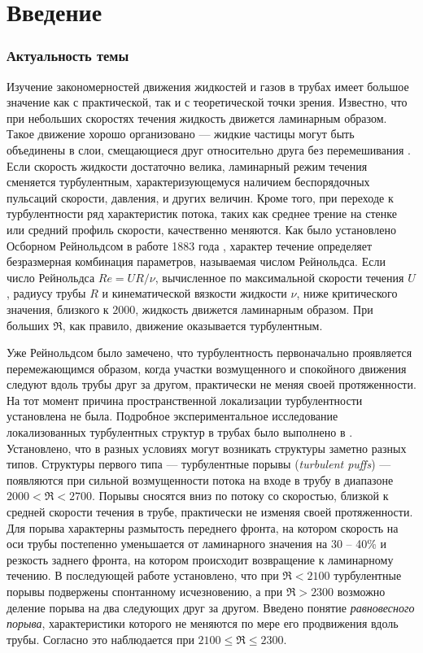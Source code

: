 \chapter{Введение}

\subsection{Актуальность темы} 

Изучение закономерностей движения жидкостей и газов в трубах имеет большое значение как с практической, так и с теоретической точки зрения. Известно, что при небольших скоростях течения жидкость движется ламинарным образом. Такое движение хорошо организовано --- жидкие частицы могут быть объединены в слои, смещающиеся друг относительно друга без перемешивания \cite{Hof2010}. Если скорость жидкости достаточно велика, ламинарный режим течения сменяется турбулентным, характеризующемуся наличием беспорядочных пульсаций скорости, давления, и других величин. Кроме того, при переходе к турбулентности ряд характеристик потока, таких как среднее трение на стенке или средний профиль скорости, качественно меняются. Как было установлено Осборном Рейнольдсом в работе 1883 года \cite{Reynolds1883}, характер течение определяет безразмерная комбинация параметров, называемая числом Рейнольдса. Если число Рейнольдса $Re=UR/\nu$, вычисленное по максимальной скорости течения $U$, радиусу трубы $R$ и кинематической вязкости жидкости $\nu$, ниже критического значения, близкого к $2000$, жидкость движется ламинарным образом. При больших $\Re$, как правило, движение оказывается турбулентным.

Уже Рейнольдсом было замечено, что турбулентность первоначально проявляется перемежающимся образом, когда участки возмущенного и спокойного движения следуют вдоль трубы друг за другом, практически не меняя своей протяженности. На тот момент причина пространственной локализации турбулентности установлена не была. Подробное экспериментальное исследование локализованных турбулентных структур в трубах было выполнено в \cite{Wygnanski1973}. Установлено, что в разных условиях могут возникать структуры заметно разных типов. Структуры первого типа --- турбулентные порывы ({\it turbulent puffs}) --- появляются при сильной возмущенности потока на входе в трубу в диапазоне $2000<\Re<2700$. Порывы сносятся вниз по потоку со скоростью, близкой к средней скорости течения в трубе, практически не изменяя своей протяженности. Для порыва характерны размытость переднего фронта, на котором скорость на оси трубы постепенно уменьшается от ламинарного значения на 30 -- 40\% и резкость заднего фронта, на котором происходит возвращение к ламинарному течению. В последующей работе \cite{Wygnanski1975} установлено, что при $\Re<2100$ турбулентные порывы подвержены спонтанному исчезновению, а при $\Re>2300$ возможно деление порыва на два следующих друг за другом. Введено понятие {\it равновесного порыва}, характеристики которого не меняются по мере его продвижения вдоль трубы. Согласно \cite{Wygnanski1975} это наблюдается при $2100\leqslant\Re\leqslant2300$. 

